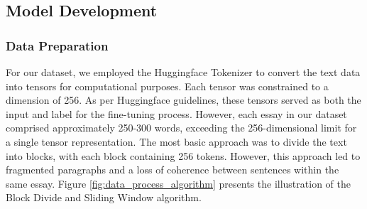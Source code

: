 \documentclass[conference]{IEEEtran}
\def\BibTeX{{\rm B\kern-.05em{\sc i\kern-.025em b}\kern-.08em
    T\kern-.1667em\lower.7ex\hbox{E}\kern-.125emX}}
\begin{document}







        
\subsection{Model Development}\label{SCM}
\subsubsection{Data Preparation}\label{SCM}
For our dataset, we employed the Huggingface Tokenizer to convert the text data into tensors for computational purposes. Each tensor was constrained to a dimension of 256. As per Huggingface guidelines, these tensors served as both the input and label for the fine-tuning process. However, each essay in our dataset comprised approximately 250-300 words, exceeding the 256-dimensional limit for a single tensor representation. The most basic approach was to divide the text into blocks, with each block containing 256 tokens. However, this approach led to fragmented paragraphs and a loss of coherence between sentences within the same essay. Figure \ref{fig:data_process_algorithm} presents the illustration of the Block Divide and Sliding Window algorithm.
\end{document}
